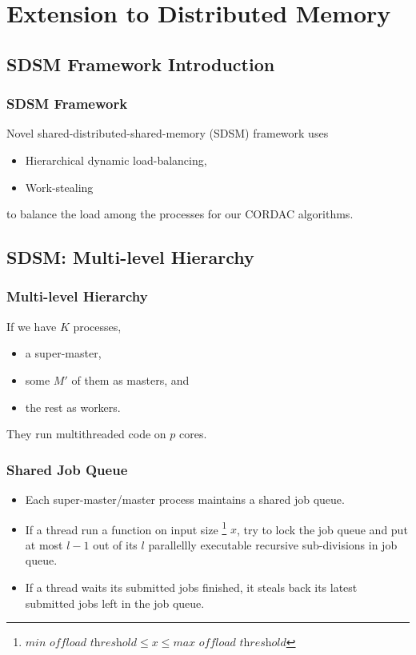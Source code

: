 \section{Extension to Distributed Memory}

\subsection{SDSM Framework Introduction}
\begin{frame}
    \frametitle{SDSM Framework}
    	Novel shared-distributed-shared-memory (SDSM) 
    	framework uses
    \begin{itemize}
    	\item Hierarchical dynamic load-balancing,
    	\item Work-stealing
    \end{itemize}
     	to balance the load among the processes for our CORDAC algorithms.
\end{frame}

\subsection{SDSM: Multi-level Hierarchy}
\begin{frame}
    \frametitle{Multi-level Hierarchy}
    If we have $K$ processes,
    \begin{itemize}
    	\item a super-master,
    	\item some $M'$ of them as masters, and
    	\item the rest as workers.
    \end{itemize}
    They run multithreaded code on $p$ cores.
\end{frame}

\begin{frame}
    \frametitle{Shared Job Queue}
    \begin{itemize}
    	\item Each super-master/master process maintains a shared 
    		job queue.
    	\item If a thread run a function on input size
            \footnote{$\textit{min offload threshold} \le x \le \textit{max offload threshold}$}
             $x$, 
    		try to lock the job queue and put at most $l-1$
    		out of its $l$ parallellly executable recursive sub-divisions in job queue.
    	\item If a thread waits its submitted jobs finished,
    		it steals back its latest submitted jobs left in the job queue.
    \end{itemize}
\end{frame}

